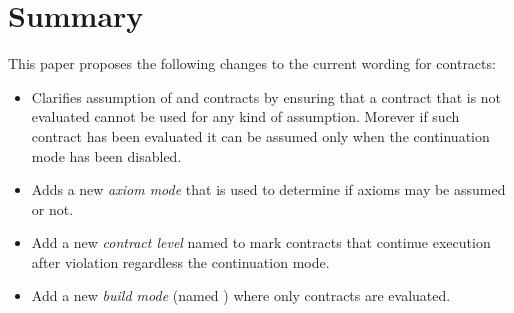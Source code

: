 \section{Summary}

This paper proposes the following changes to the current wording for contracts:

\begin{itemize}

\item Clarifies assumption of  and  contracts by
ensuring that a contract that is not evaluated cannot be used for any kind of
assumption. Morever if such contract has been evaluated it can be assumed only
when the continuation mode has been disabled.

\item Adds a new \emph{axiom mode} that is used to determine if axioms may be
assumed or not.

\item Add a new \emph{contract level} named  to mark contracts
that continue execution after violation regardless the continuation mode.

\item Add a new \emph{build mode} (named ) where only  contracts
are evaluated.

\end{itemize}
